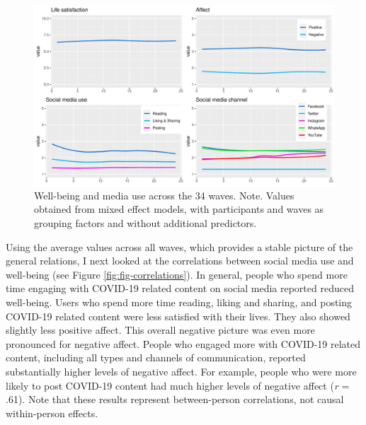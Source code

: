 \documentclass[
  man,mask,floatsintext]{apa7}
\begin{document}
\begin{figure}
\includegraphics[width=\textwidth]{figures/fig_descriptives} \caption{Well-being and media use across the 34 waves. Note. Values obtained from mixed effect models, with participants and waves as grouping factors and without additional predictors.}\label{fig:fig-descriptives}
\end{figure}

Using the average values across all waves, which provides a stable picture of the general relations, I next looked at the correlations between social media use and well-being (see Figure \ref{fig:fig-correlations}).
In general, people who spend more time engaging with COVID-19 related content on social media reported reduced well-being.
Users who spend more time reading, liking and sharing, and posting COVID-19 related content were less satisfied with their lives.
They also showed slightly less positive affect.
This overall negative picture was even more pronounced for negative affect.
People who engaged more with COVID-19 related content, including all types and channels of communication, reported substantially higher levels of negative affect.
For example, people who were more likely to post COVID-19 content had much higher levels of negative affect (\emph{r} = .61).
Note that these results represent between-person correlations, not causal within-person effects.
\end{document}
